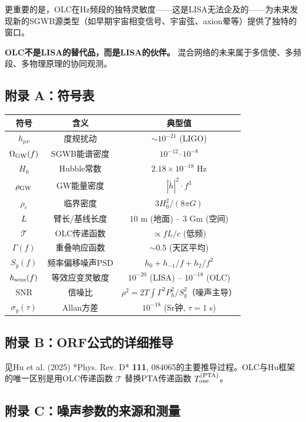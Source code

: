 \documentclass[12pt,a4paper]{article}
\begin{document}
更重要的是，OLC在Hz频段的独特灵敏度——这是LISA无法企及的——为未来发现新的SGWB源类型（如早期宇宙相变信号、宇宙弦、axion晕等）提供了独特的窗口。

\textbf{OLC不是LISA的替代品，而是LISA的伙伴。} 混合网络的未来属于多信使、多频段、多物理原理的协同观测。


\subsection{附录 A：符号表}


\begin{tabular}{|c|c|c|}
\hline
符号 & 含义 & 典型值 \\
\hline
$h_{\mu\nu}$ & 度规扰动 & $\sim 10^{-21}$ (LIGO) \\
$\Omega_{\rm GW}(f)$ & SGWB能谱密度 & $10^{-12}$–$10^{-8}$ \\
$H_0$ & Hubble常数 & $2.18 \times 10^{-18}$ Hz \\
$\rho_{\rm GW}$ & GW能量密度 & $|\tilde{h}|^2 \cdot f^3$ \\
$\rho_c$ & 临界密度 & $3H_0^2/(8\pi G)$ \\
$L$ & 臂长/基线长度 & $10$ m (地面) – $3$ Gm (空间) \\
$\mathcal{T}$ & OLC传递函数 & $\propto fL/c$ (低频) \\
$\Gamma(f)$ & 重叠响应函数 & $\sim 0.5$ (天区平均) \\
$S_y(f)$ & 频率偏移噪声PSD & $h_0 + h_{-1}/f + h_2/f^2$ \\
$h_{\rm sens}(f)$ & 等效应变灵敏度 & $10^{-20}$ (LISA) – $10^{-18}$ (OLC) \\
SNR & 信噪比 & $\rho^2 = 2T \int \Gamma^2 P_h^2/S_y^2$（噪声主导） \\
$\sigma_y(\tau)$ & Allan方差 & $10^{-18}$ (Sr钟, $\tau=1$ s) \\
\hline
\end{tabular}


\subsection{附录 B：ORF公式的详细推导}


见Hu et al. (2025) *Phys. Rev. D* \textbf{111}, 084065的主要推导过程。OLC与Hu框架的唯一区别是用OLC传递函数 $\mathcal{T}$ 替换PTA传递函数 $T_{\rm one}^{\rm (PTA)}$。

\subsection{附录 C：噪声参数的来源和测量}
\end{document}
